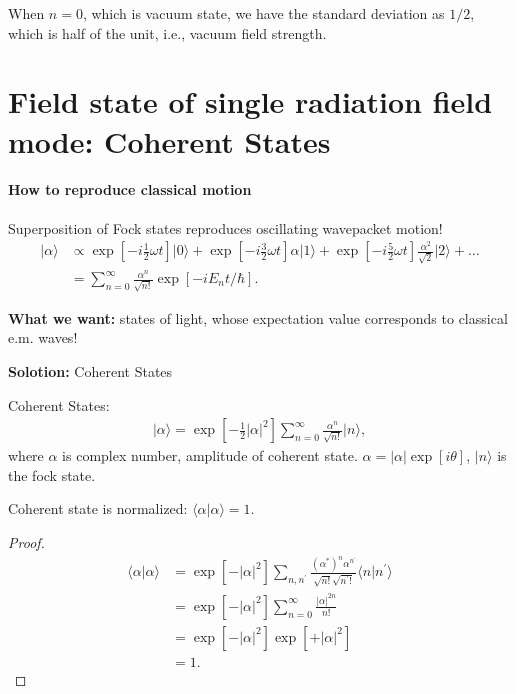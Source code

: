 \documentclass[../../note.tex]{subfiles}
\begin{document}
When $n = 0$, which is vacuum state, we have the standard deviation as $1/2$, which is half of the unit, i.e., vacuum field strength.

\section{Field state of single radiation field mode: Coherent States}
\paragraph{How to reproduce classical motion}
Superposition of Fock states reproduces oscillating wavepacket motion! 
\begin{align}
    \vert \alpha \rangle 
    &\propto \exp[-i\frac{1}{2} \omega t] \vert 0 \rangle +  \exp[-i\frac{3}{2} \omega t] \alpha \vert 1 \rangle +
    \exp[-i\frac{5}{2} \omega t] \frac{\alpha^2}{\sqrt{2}}\vert 2 \rangle + \dots \\
    &= \sum_{n=0}^{\infty} \frac{\alpha^n}{\sqrt{n !}} \exp\left[-i E_n t / \hbar \right].
\end{align}

\textbf{What we want:} states of light, whose expectation value corresponds to classical e.m. waves!

\textbf{Solotion:} Coherent States
\begin{definition}
    Coherent States:
    \begin{align}
        \vert \alpha \rangle = \exp\left[-\frac{1}{2} \vert \alpha \vert^2 \right] \sum_{n=0}^{\infty} \frac{\alpha^n}{\sqrt{n !}} \vert n \rangle,
    \end{align}
    where $\alpha$ is complex number, amplitude of coherent state. $\alpha = \vert \alpha \vert \exp[i \theta]$, $\vert n \rangle$ is the fock state.
\end{definition}

\begin{lemma}
    Coherent state is normalized: $\langle \alpha \vert \alpha \rangle = 1$.
\end{lemma}
\begin{proof}
    \begin{align}
        \langle \alpha \vert \alpha \rangle
        &= \exp\left[- \vert \alpha \vert^2 \right] \sum_{n, n^\prime} \frac{(\alpha^\ast)^n \alpha^{n^\prime}}{ \sqrt{n!} \sqrt{n^\prime !}} \langle n \vert n^\prime \rangle \\
        &= \exp\left[-\vert \alpha \vert^2 \right] \sum_{n=0}^{\infty} \frac{\vert \alpha \vert^{2 n}}{n !} \\
        &= \exp\left[-\vert \alpha \vert^2 \right] \exp\left[+ \vert \alpha \vert^2 \right] \\
        &= 1.
    \end{align}
\end{proof}
\end{document}
